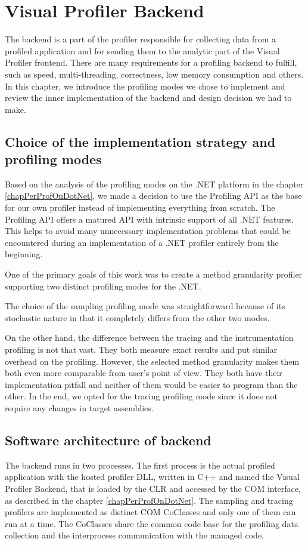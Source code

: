 \chapter{Visual Profiler Backend}
\label{chap04:chapter}
The backend is a part of the profiler responsible for collecting data from a profiled application and for sending them to the analytic part of the Visual Profiler frontend. There are many requirements for a profiling backend to fulfill, such as speed, multi-threading, correctness, low memory consumption and others. In this chapter, we introduce the profiling modes we chose to implement and review the inner implementation of the backend and design decision we had to make.

\section{Choice of the implementation strategy and profiling modes}
Based on the analysis of the profiling modes on the .NET platform in the chapter \ref{chapPerProfOnDotNet}, we made a decision to use the Profiling API as the base for our own profiler instead of implementing everything from scratch. The Profiling API offers a 	 matured API with intrinsic support of all .NET features. This helps to avoid many unnecessary implementation problems that could be encountered during an implementation of a .NET profiler entirely from the beginning.

One of the primary goals of this work was to create a method granularity profiler supporting two distinct profiling modes for the .NET.

The choice of the sampling profiling mode was straightforward because of its stochastic nature in that it completely differs from the other two modes. 

On the other hand, the difference between the tracing and the instrumentation profiling is not that vast. They both measure exact results and put similar overhead on the profiling. However, the selected method granularity makes them both even more comparable from user's point of view. They both have their implementation pitfall and neither of them would be easier to program than the other. In the end, we opted for the tracing profiling mode since it does not require any changes in target assemblies.

\section{Software architecture of backend }
The backend runs in two processes. The first process is the actual profiled application with the hosted profiler DLL, written in C++ and named the Visual Profiler Backend, that is loaded by the CLR and accessed by the COM interface, as described in the chapter \ref{chapPerProfOnDotNet}. The sampling and tracing profilers are implemented as distinct COM CoClasses and only one of them can run at a time. The CoClasses share the common code base for the profiling data collection and the interprocess communication with the managed code.

